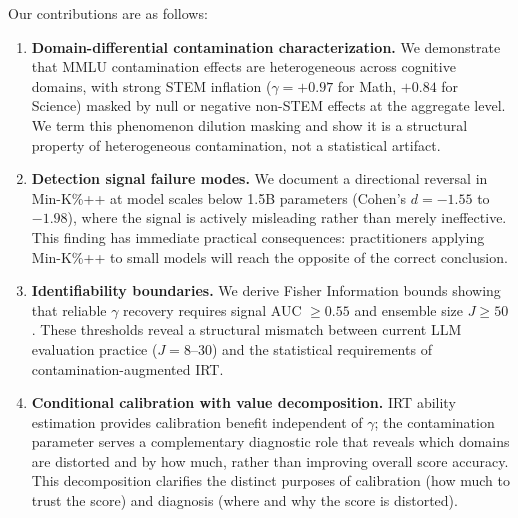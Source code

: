 Our contributions are as follows:
\begin{enumerate}
    \item \textbf{Domain-differential contamination characterization.} We demonstrate that MMLU contamination effects are heterogeneous across cognitive domains, with strong STEM inflation ($\gamma = +0.97$ for Math, $+0.84$ for Science) masked by null or negative non-STEM effects at the aggregate level. We term this phenomenon dilution masking and show it is a structural property of heterogeneous contamination, not a statistical artifact.
    \item \textbf{Detection signal failure modes.} We document a directional reversal in Min-K\%++ at model scales below 1.5B parameters (Cohen's $d = -1.55$ to $-1.98$), where the signal is actively misleading rather than merely ineffective. This finding has immediate practical consequences: practitioners applying Min-K\%++ to small models will reach the opposite of the correct conclusion.
    \item \textbf{Identifiability boundaries.} We derive Fisher Information bounds showing that reliable $\gamma$ recovery requires signal AUC $\geq 0.55$ and ensemble size $J \geq 50$. These thresholds reveal a structural mismatch between current LLM evaluation practice ($J = 8$--$30$) and the statistical requirements of contamination-augmented IRT.
    \item \textbf{Conditional calibration with value decomposition.} IRT ability estimation provides calibration benefit independent of $\gamma$; the contamination parameter serves a complementary diagnostic role that reveals which domains are distorted and by how much, rather than improving overall score accuracy. This decomposition clarifies the distinct purposes of calibration (how much to trust the score) and diagnosis (where and why the score is distorted).
\end{enumerate}
